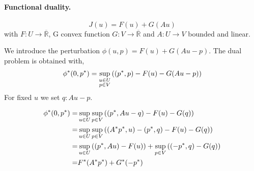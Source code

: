 \paragraph{Functional duality.}
\[
	J(u)=F(u)+G(Au)
\]
 with $F:U\rightarrow\overline{\mathbb{R}}$,  G convex function $G: V\rightarrow \overline{\mathbb{R}}$ and $A:U\rightarrow V$ bounded and linear.
 
 We introduce the perturbation $\phi(u, p) = F(u)+G(Au-p)$. The dual problem is obtained with,
 \[
	 {\phi}^{\ast}(0, {p}^{\ast})=\sup_{\substack{u\in U\\ p \in V} }\left( ({p}^{\ast},p)-F(u)-G(Au-p)\right)
 \]
 For fixed $u$ we set $q: Au -p$.
 
 \begin{align*}
 {\phi}^{\ast}(0, {p}^{\ast})=&\sup_{u\in U} \sup_{p\in V} \left(\left({p}^{\ast}, Au-q\right)-F(u)-G(q)\right)\\
 =&\sup_{u\in U} \sup_{p\in V} \left(\left({A}^{\ast}{p}^{\ast}, u\right)-({p}^{\ast}, q)-F(u)-G(q)\right)\\
 =&\sup_{u\in U}  \left(\left({p}^{\ast}, Au\right)-F(u)\right)+\sup_{p\in V}\left((-{p}^{\ast},q)-G(q)\right)\\
 =&{F}^{\ast}({A}^{\ast}{p}^{\ast})+{G}^{\ast}(-{p}^{\ast})
 \end{align*}